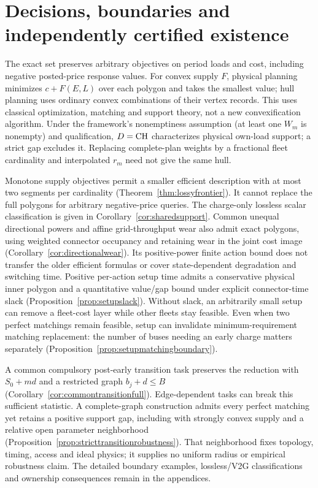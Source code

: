 \section{Decisions, boundaries and independently certified existence}
\label{sec:coreconsequences}
The exact set preserves arbitrary objectives on period loads and cost,
including negative posted-price response values. For convex supply $F$,
physical planning minimizes $c+F(E,L)$ over each polygon and takes the
smallest value; hull planning uses ordinary convex combinations of their
vertex records. This uses classical optimization, matching and support
theory, not a new convexification algorithm. Under the framework's
nonemptiness assumption (at least one $W_m$ is nonempty) and
qualification, $D=\mathrm{CH}$ characterizes physical own-load support; a strict
gap excludes it. Replacing complete-plan weights by a fractional fleet
cardinality and interpolated $r_m$ need not give the same hull.

Monotone supply objectives permit a smaller efficient description with
at most two segments per cardinality
(Theorem~\ref{thm:lossyfrontier}). It cannot replace the full polygons
for arbitrary negative-price queries. The charge-only lossless scalar classification
is given in Corollary~\ref{cor:sharedsupport}. Common unequal directional
powers and affine grid-throughput wear also admit exact polygons, using
weighted connector occupancy and retaining wear in the joint cost image
(Corollary~\ref{cor:directionalwear}). Its positive-power finite
action bound does not transfer the older efficient formulas or cover
state-dependent degradation and switching time.
Positive per-action setup time admits a conservative physical inner polygon
and a quantitative value/gap bound under explicit connector-time slack
(Proposition~\ref{prop:setupslack}). Without slack, an arbitrarily small
setup can remove a fleet-cost layer while other fleets stay feasible.
Even when two perfect matchings remain feasible, setup can invalidate
minimum-requirement matching replacement: the number of buses needing an
early charge matters separately (Proposition~\ref{prop:setupmatchingboundary}).

A common compulsory post-early transition task preserves the reduction
with $S_0+md$ and a restricted graph $b_j+d\le B$
(Corollary~\ref{cor:commontransitionfull}). Edge-dependent tasks can
break this sufficient statistic. A complete-graph construction admits
every perfect matching yet retains a positive support gap, including
with strongly convex supply and a relative open parameter neighborhood
(Proposition~\ref{prop:stricttransitionrobustness}). That neighborhood
fixes topology, timing, access and ideal physics; it supplies no uniform
radius or empirical robustness claim. The detailed boundary examples,
lossless/V2G classifications and ownership consequences remain in the
appendices.

